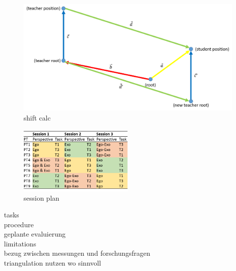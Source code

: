 \begin{figure}[htb]
	\centering
	\includegraphics[width=\textwidth]{figures/shift_calc.png}
	\caption[shift calc]{shift calc}
	\label{fig:shift_calc}
\end{figure}



\begin{figure}[htb]
	\centering
	\includegraphics[width=0.5\textwidth]{figures/study_session_plan.png}
	\caption[session plan]{session plan}
	\label{fig:study_session_plan}
\end{figure}

tasks\\
procedure\\
geplante evaluierung\\
limitations\\
bezug zwischen messungen und forschungsfragen\\
triangulation nutzen wo sinnvoll\\
